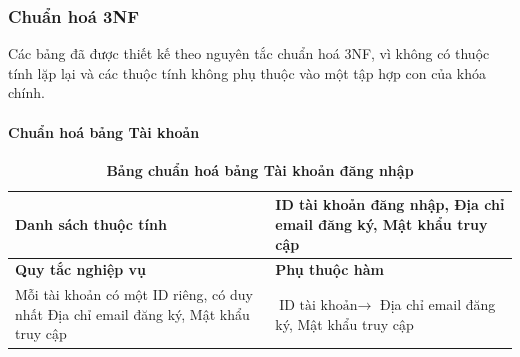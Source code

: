 \subsubsection{Chuẩn hoá 3NF}
Các bảng đã được thiết kế theo nguyên tắc chuẩn hoá 3NF, vì không có thuộc tính lặp lại và các thuộc tính không phụ thuộc vào một tập hợp con của khóa chính.

\paragraph{Chuẩn hoá bảng Tài khoản}
\mbox{}
\begin{table}[H]
	\caption{\bfseries \fontsize{12pt}{0pt}\selectfont Bảng chuẩn hoá bảng Tài khoản đăng nhập}
	\centering
	\begin{tabularx}{0.9\textwidth}{|X|X|}
		\hline
		\textbf{Danh sách thuộc tính} & ID tài khoản đăng nhập, Địa chỉ email đăng ký, Mật khẩu truy cập                                   \\
		\hline
		\textbf{Quy tắc nghiệp vụ}    & \textbf{Phụ thuộc hàm}                                                                             \\
		\hline
		Mỗi tài khoản có một ID riêng, có duy nhất Địa chỉ email đăng ký, Mật khẩu truy cập
		                              & \parbox[t]{\linewidth}{$\text{ID tài khoản} \rightarrow$ Địa chỉ email đăng ký, Mật khẩu truy cập} \\
		\hline
		                                             \\
		                                                       \\
		\hline
	\end{tabularx}
\end{table}

